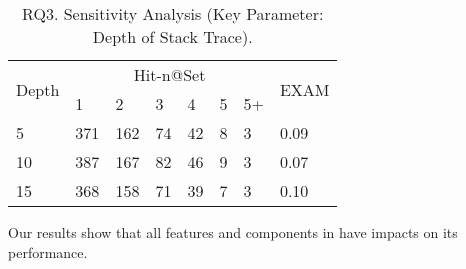 
\begin{table}[t]
	\caption{RQ3. Sensitivity Analysis (Key Parameter: Depth of Stack Trace).}
	{\small
		\begin{center}
			\renewcommand{\arraystretch}{1}
			\begin{tabular}{p{1cm}|p{0.3cm}<{\centering}|p{0.3cm}<{\centering}|p{0.3cm}<{\centering}|p{0.3cm}<{\centering}|p{0.3cm}<{\centering}|p{0.3cm}<{\centering}|p{0.7cm}<{\centering}}
				\hline
				\multirow{2}{*}{Depth}    & \multicolumn{6}{c|}{Hit-n@Set}& \multirow{2}{*}{EXAM}\\
				\cline{2-7}
				&1&2&3&4&5&5+&\\
				
				\hline 
				5 			                & 371 & 162 & 74  & 42 & 8 & 3   & 0.09\\
				10                          & 387 & 167 & 82  & 46 & 9 & 3   & 0.07\\
				15	                        & 368 & 158 & 71  & 39 & 7 & 3   & 0.10\\
				\hline
			\end{tabular}
			
			\label{fig:rq3-2}
		\end{center}
	}
\end{table}


Our results show that all features and components in {\tool} have
impacts on its performance.
